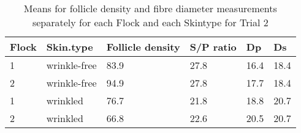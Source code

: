 %

\begin{table}[ht]
\centering
\caption{Means for follicle density and fibre diameter measurements separately for each Flock and each Skintype for Trial 2}
\label{tab:follmeas}
\vspace{0.1in}
\begin{tabular}{|p{0.5in}|p{0.6in}|p{0.6in}|p{0.6in}|p{0.6in}|p{0.6in}|} \hline
  Flock & Skin.type & Follicle density & S/P ratio & Dp  & Ds\\   
    \hline
  1 & wrinkle-free & 83.9 & 27.8 & 16.4 & 18.4  \\ 
  2 & wrinkle-free & 94.9 & 27.8 & 17.7 & 18.4  \\ 
  1 & wrinkled & 76.7 & 21.8 & 18.8 & 20.7 \\ 
  2 & wrinkled & 66.8 & 22.6 & 20.5 & 20.7  \\ 
   \hline
\end{tabular}
\end{table}

%



